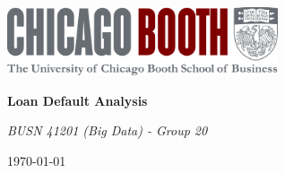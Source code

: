 \usepackage{graphicx}



\begin{titlepage}
  \centering
  \vspace*{2cm}

  \includegraphics[width=0.6\textwidth]{cover_image.png}

  \vspace{1cm}

  {\Huge\bfseries Loan Default Analysis}

  \vspace{2cm}

  {\Large\itshape BUSN 41201 (Big Data) - Group 20}

  \vfill

  {\large\today} %

\end{titlepage}


